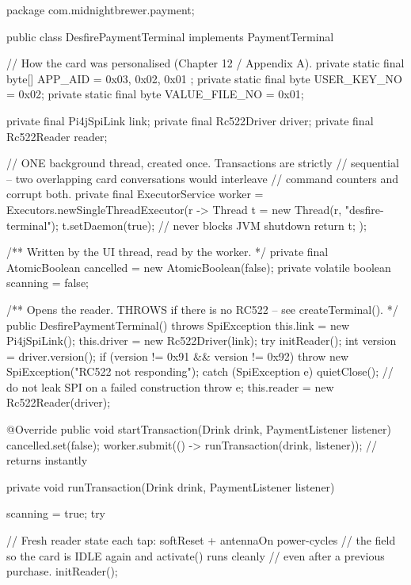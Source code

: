 \begin{jcode}
package com.midnightbrewer.payment;

public class DesfirePaymentTerminal implements PaymentTerminal {

    // How the card was personalised (Chapter 12 / Appendix A).
    private static final byte[] APP_AID       = { 0x03, 0x02, 0x01 };
    private static final byte   USER_KEY_NO   = 0x02;
    private static final byte   VALUE_FILE_NO = 0x01;

    private final Pi4jSpiLink link;
    private final Rc522Driver driver;
    private final Rc522Reader reader;

    // ONE background thread, created once. Transactions are strictly
    // sequential -- two overlapping card conversations would interleave
    // command counters and corrupt both.
    private final ExecutorService worker =
            Executors.newSingleThreadExecutor(r -> {
                Thread t = new Thread(r, "desfire-terminal");
                t.setDaemon(true);      // never blocks JVM shutdown
                return t;
            });

    /** Written by the UI thread, read by the worker. */
    private final AtomicBoolean cancelled = new AtomicBoolean(false);
    private volatile boolean scanning = false;

    /** Opens the reader. THROWS if there is no RC522 -- see createTerminal(). */
    public DesfirePaymentTerminal() throws SpiException {
        this.link = new Pi4jSpiLink();
        this.driver = new Rc522Driver(link);
        try {
            initReader();
            int version = driver.version();
            if (version != 0x91 && version != 0x92) {
                throw new SpiException("RC522 not responding");
            }
        } catch (SpiException e) {
            quietClose();               // do not leak SPI on a failed construction
            throw e;
        }
        this.reader = new Rc522Reader(driver);
    }

    @Override
    public void startTransaction(Drink drink, PaymentListener listener) {
        cancelled.set(false);
        worker.submit(() -> runTransaction(drink, listener));   // returns instantly
    }

    private void runTransaction(Drink drink, PaymentListener listener) {
        scanning = true;
        try {
            // Fresh reader state each tap: softReset + antennaOn power-cycles
            // the field so the card is IDLE again and activate() runs cleanly
            // even after a previous purchase.
            initReader();

}}}
\end{jcode}
